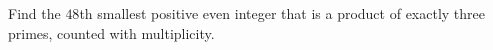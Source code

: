 Find the $48$th smallest positive even integer that is a product of exactly three primes, counted with multiplicity.
